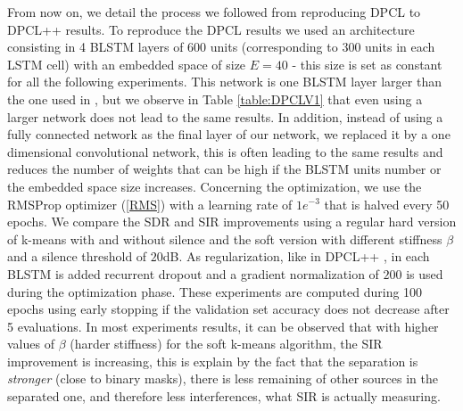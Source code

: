 \documentclass[master, tikz, final,11pt, dvipdfmx]{iscs-thesis}
\begin{document}
From now on, we detail the process we followed from reproducing DPCL \cite{DPCLV1} to DPCL++ \cite{DPCLV2} results.
To reproduce the DPCL results we used an architecture consisting in 4 BLSTM layers of 600 units (corresponding to 300 units in each LSTM cell) with an embedded space of size $E=40$ - this size is set as constant for all the following experiments. This network is one BLSTM layer larger than the one used in \cite{DPCLV1}, but we observe in Table \ref{table:DPCLV1} that even using a larger network does not lead to the same results. In addition, instead of using a fully connected network as the final layer of our network, we replaced it by a one dimensional convolutional network, this is often leading to the same results and reduces the number of weights that can be high if the BLSTM units number or the embedded space size increases. Concerning the optimization, we use the RMSProp optimizer (\ref{RMS}) with a learning rate of $1e^{-3}$ that is halved every 50 epochs. We compare the SDR and SIR improvements using a regular hard version of k-means with and without silence and the soft version with different stiffness $\beta$ and a silence threshold of $20$dB. As regularization, like in DPCL++ \cite{DPCLV2}, in each BLSTM is added recurrent dropout and a gradient normalization of $200$ is used during the optimization phase.
These experiments are computed during 100 epochs using early stopping if the validation set accuracy does not decrease after 5 evaluations.
In most experiments results, it can be observed that with higher values of $\beta$ (harder stiffness) for the soft k-means algorithm, the SIR improvement is increasing, this is explain by the fact that the separation is \textit{stronger} (close to binary masks), there is less remaining of other sources in the separated one, and therefore less interferences, what SIR is actually measuring.
\end{document}
